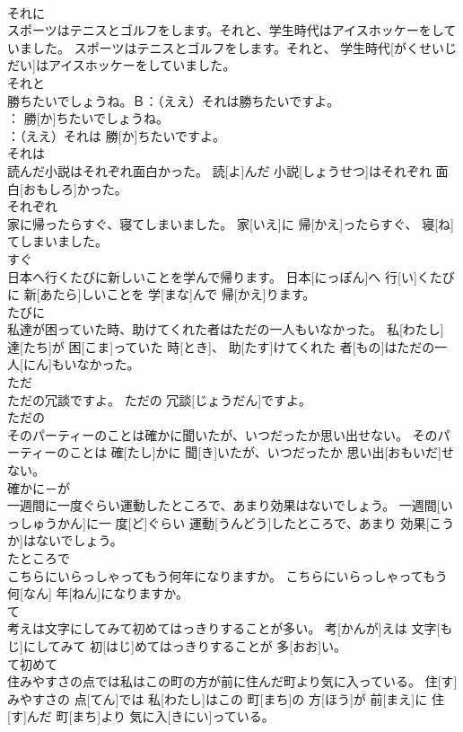 \documentclass[8pt]{extreport}
\begin{document}
\begin{CJK}{UTF8}{min}
\\	それに	
\\	スポーツはテニスとゴルフをします。それと、学生時代はアイスホッケーをしていました。	スポーツはテニスとゴルフをします。それと、 学生時代[がくせいじだい]はアイスホッケーをしていました。	
\\	それと	
\\	勝ちたいでしょうね。Ｂ：（ええ）それは勝ちたいですよ。	
\\	[えい]： 勝[か]ちたいでしょうね。 
\\	[びー]：（ええ）それは 勝[か]ちたいですよ。	
\\	それは	
\\	読んだ小説はそれぞれ面白かった。	読[よ]んだ 小説[しょうせつ]はそれぞれ 面白[おもしろ]かった。	
\\	それぞれ	
\\	家に帰ったらすぐ、寝てしまいました。	家[いえ]に 帰[かえ]ったらすぐ、 寝[ね]てしまいました。	
\\	すぐ	
\\	日本へ行くたびに新しいことを学んで帰ります。	日本[にっぽん]へ 行[い]くたびに 新[あたら]しいことを 学[まな]んで 帰[かえ]ります。	
\\	たびに	
\\	私達が困っていた時、助けてくれた者はただの一人もいなかった。	私[わたし] 達[たち]が 困[こま]っていた 時[とき]、 助[たす]けてくれた 者[もの]はただの一 人[にん]もいなかった。	
\\	ただ	
\\	ただの冗談ですよ。	ただの 冗談[じょうだん]ですよ。	
\\	ただの	
\\	そのパーティーのことは確かに聞いたが、いつだったか思い出せない。	そのパーティーのことは 確[たし]かに 聞[き]いたが、いつだったか 思い出[おもいだ]せない。	
\\	確かに－が	
\\	一週間に一度ぐらい運動したところで、あまり効果はないでしょう。	一週間[いっしゅうかん]に一 度[ど]ぐらい 運動[うんどう]したところで、あまり 効果[こうか]はないでしょう。	
\\	たところで	
\\	こちらにいらっしゃってもう何年になりますか。	こちらにいらっしゃってもう 何[なん] 年[ねん]になりますか。	
\\	て	
\\	考えは文字にしてみて初めてはっきりすることが多い。	考[かんが]えは 文字[もじ]にしてみて 初[はじ]めてはっきりすることが 多[おお]い。	
\\	て初めて	
\\	住みやすさの点では私はこの町の方が前に住んだ町より気に入っている。	住[す]みやすさの 点[てん]では 私[わたし]はこの 町[まち]の 方[ほう]が 前[まえ]に 住[す]んだ 町[まち]より 気に入[きにい]っている。	

\end{CJK}
\end{document}
